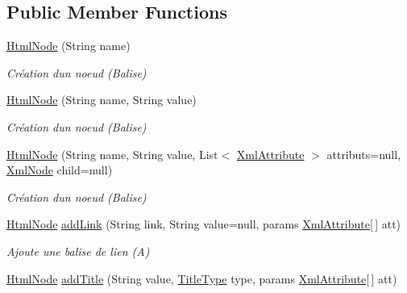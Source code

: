 \subsection*{Public Member Functions}
\begin{DoxyCompactItemize}
\item 
\mbox{\hyperlink{class_n_t_k_1_1_i_o_1_1_html_1_1_html_node_aebba3d90436a2952571b8660e3bed858}{Html\+Node}} (String name)
\begin{DoxyCompactList}\small\item\em Création d\textquotesingle{}un noeud (Balise) \end{DoxyCompactList}\item 
\mbox{\hyperlink{class_n_t_k_1_1_i_o_1_1_html_1_1_html_node_aa66ba6aa4b13a509f78d82b47eab7062}{Html\+Node}} (String name, String value)
\begin{DoxyCompactList}\small\item\em Création d\textquotesingle{}un noeud (Balise) \end{DoxyCompactList}\item 
\mbox{\hyperlink{class_n_t_k_1_1_i_o_1_1_html_1_1_html_node_aeae3b237f18253d572abce25b58494dc}{Html\+Node}} (String name, String value, List$<$ \mbox{\hyperlink{class_n_t_k_1_1_i_o_1_1_xml_1_1_xml_attribute}{Xml\+Attribute}} $>$ attributs=null, \mbox{\hyperlink{class_n_t_k_1_1_i_o_1_1_xml_1_1_xml_node}{Xml\+Node}} child=null)
\begin{DoxyCompactList}\small\item\em Création d\textquotesingle{}un noeud (Balise) \end{DoxyCompactList}\item 
\mbox{\hyperlink{class_n_t_k_1_1_i_o_1_1_html_1_1_html_node}{Html\+Node}} \mbox{\hyperlink{class_n_t_k_1_1_i_o_1_1_html_1_1_html_node_a2179564c7de772e0727ba570cdc97d18}{add\+Link}} (String link, String value=null, params \mbox{\hyperlink{class_n_t_k_1_1_i_o_1_1_xml_1_1_xml_attribute}{Xml\+Attribute}}\mbox{[}$\,$\mbox{]} att)
\begin{DoxyCompactList}\small\item\em Ajoute une balise de lien (A) \end{DoxyCompactList}\item 
\mbox{\hyperlink{class_n_t_k_1_1_i_o_1_1_html_1_1_html_node}{Html\+Node}} \mbox{\hyperlink{class_n_t_k_1_1_i_o_1_1_html_1_1_html_node_a025fa459ef54ab496311da8fe7f3d8ca}{add\+Title}} (String value, \mbox{\hyperlink{namespace_n_t_k_1_1_i_o_1_1_html_a871eb4a91323a2ea84afdabe1ac01ce3}{Title\+Type}} type, params \mbox{\hyperlink{class_n_t_k_1_1_i_o_1_1_xml_1_1_xml_attribute}{Xml\+Attribute}}\mbox{[}$\,$\mbox{]} att)

\end{DoxyCompactItemize}
